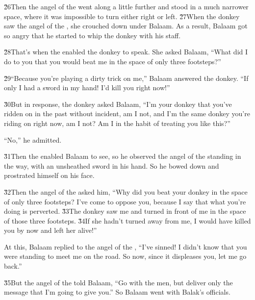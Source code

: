 \v{26}Then the angel of the  went along a little further and stood in a much narrower space, where it was impossible to turn either right or left. \v{27}When the donkey saw the angel of the , she crouched down under Balaam. As a result, Balaam got so angry that he started to whip the donkey with his staff.

\v{28}That's when the  enabled the donkey to speak. She asked Balaam, ``What did I do to you that you would beat me in the space of only three footsteps?''

\v{29}``Because you're playing a dirty trick on me,'' Balaam answered the donkey. ``If only I had a sword in my hand! I'd kill you right now!''

\v{30}But in response, the donkey asked Balaam, ``I'm your donkey that you've ridden on in the past without incident, am I not, and I'm the same donkey you're riding on right now, am I not? Am I in the habit of treating you like this?''

``No,'' he admitted.

\v{31}Then the  enabled Balaam to see, so he observed the angel of the  standing in the way, with an unsheathed sword in his hand. So he bowed down and prostrated himself on his face.

\v{32}Then the angel of the  asked him, ``Why did you beat your donkey in the space of only three footsteps? I've come to oppose you, because I say that what you're doing is perverted. \v{33}The donkey saw me and turned in front of me in the space of those three footsteps. \v{34}If she hadn't turned away from me, I would have killed you by now and left her alive!''

At this, Balaam replied to the angel of the , ``I've sinned! I didn't know that you were standing to meet me on the road. So now, since it displeases you, let me go back.''

\v{35}But the angel of the  told Balaam, ``Go with the men, but deliver only the message that I'm going to give you.'' So Balaam went with Balak's officials.

